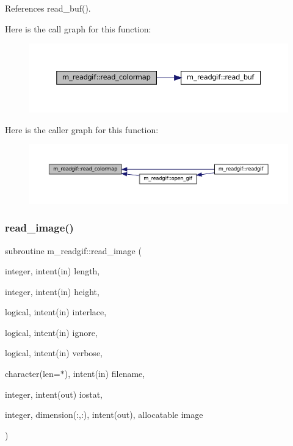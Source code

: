 References read\+\_\+buf().

Here is the call graph for this function\+:
\nopagebreak
\begin{figure}[H]
\begin{center}
\leavevmode
\includegraphics[width=350pt]{namespacem__readgif_aabaf13dcb1e665b2524049e5661ca4b6_cgraph}
\end{center}
\end{figure}
Here is the caller graph for this function\+:
\nopagebreak
\begin{figure}[H]
\begin{center}
\leavevmode
\includegraphics[width=350pt]{namespacem__readgif_aabaf13dcb1e665b2524049e5661ca4b6_icgraph}
\end{center}
\end{figure}
\mbox{\label{namespacem__readgif_a4af978d944dbefb3ddeb81cd8c54d0f9}} 
\subsubsection{\texorpdfstring{read\+\_\+image()}{read\_image()}}
{\footnotesize\ttfamily subroutine m\+\_\+readgif\+::read\+\_\+image (\begin{DoxyParamCaption}\item[{integer, intent(in)}]{length,  }\item[{integer, intent(in)}]{height,  }\item[{logical, intent(in)}]{interlace,  }\item[{logical, intent(in)}]{ignore,  }\item[{logical, intent(in)}]{verbose,  }\item[{character(len=$\ast$), intent(in)}]{filename,  }\item[{integer, intent(out)}]{iostat,  }\item[{integer, dimension(\+:,\+:), intent(out), allocatable}]{image }\end{DoxyParamCaption})\hspace{0.3cm}{\ttfamily [private]}}



